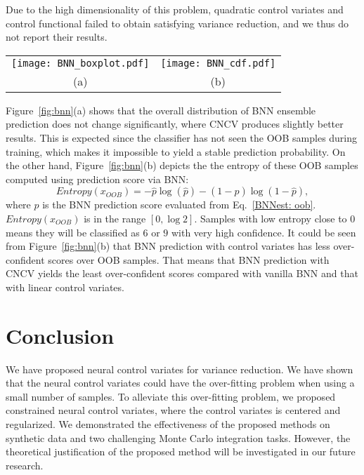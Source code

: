 \documentclass[runningheads]{llncs}
\begin{document}
Due to the high dimensionality of this problem, quadratic control variates and control functional failed to obtain satisfying variance reduction, and we thus do not report their results.

\begin{figure*}[ht!]
\centering
\vskip -0.1in
\begin{tabular}{cc}
\texttt{[image: BNN\_boxplot.pdf]} & 
\texttt{[image: BNN\_cdf.pdf]} \\
(a) & (b)
\end{tabular}
\vspace{-0.2cm}
\caption{Performance of CNCV on BNN with OOB samples (a) boxplot of the prediction score of OOB samples defined in Equation \eqref{BNNest: oob}. The prediction scores were computed based on BNN ensemble classifier for those variance reduction methods. (b) The accumulated empirical distribution of the entropy computed by prediction scores using Equation \eqref{entropy}.}
\label{fig:bnn}
\end{figure*}

Figure~\ref{fig:bnn}(a) shows that the overall  distribution of BNN ensemble prediction does not change significantly, where CNCV produces slightly better results. This is expected since the classifier has not seen the OOB samples during training, which makes it impossible to yield a stable prediction probability. On the other hand, Figure~\ref{fig:bnn}(b) depicts the the entropy of these OOB samples computed using prediction score via BNN:
\begin{equation}\label{entropy}
    Entropy(x_{OOB}) =  - \hat{p} \log (\hat{p}) - (1-\hat{p})\log (1 - \hat{p}),
\end{equation}
where $\hat{p}$ is the BNN prediction score evaluated from Eq.~\eqref{BNNest: oob}. $Entropy(x_{OOB})$ is in the range $[0, \log 2]$. Samples with low entropy close to $0$ means they will be classified as $6$ or $9$ with very high confidence. It could be seen from Figure~\ref{fig:bnn}(b) that BNN prediction with control variates has less over-confident scores over OOB samples. That means that BNN prediction with CNCV yields the least over-confident scores compared with vanilla BNN and that with linear control variates.



\section{Conclusion}
We have proposed neural control variates for variance reduction. We have shown that the neural control variates could have the over-fitting problem when using a small number of samples. To alleviate this over-fitting problem, we proposed constrained neural control variates, where the control variates is centered and regularized. We demonstrated the effectiveness of the proposed methods on synthetic data and  two challenging  Monte Carlo integration tasks. However, the theoretical justification of the proposed method will be investigated in our future research. 
\end{document}
